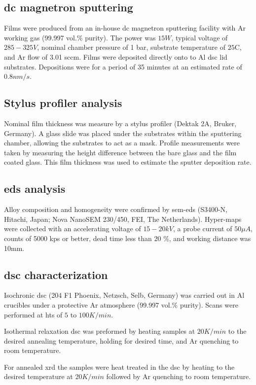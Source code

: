 \documentclass[a4paper,12pt,oneside]{article}%
\begin{document}
\subsection{\acrshort{dc} magnetron sputtering}
Films were produced from an in-house \gls{dc} magnetron sputtering facility with Ar working gas (99.997 vol.\% purity). The power was $15W$, typical voltage of $285-325V$, nominal chamber pressure of 1 bar, substrate temperature of $25$\degree C, and Ar flow of 3.01 \acrshort{sccm}. Films were deposited directly onto to Al \acrshort{dsc} lid substrates. Depositions were for a period of 35 minutes at an estimated rate of $0.8 nm/s$. 

\subsection{Stylus profiler analysis}
Nominal film thickness was measure by a stylus profiler (Dektak 2A, Bruker, Germany). A glass slide was placed under the substrates within the sputtering chamber, allowing the substrates to act as a mask. Profile measurements were taken by measuring the height difference between the bare glass and the film coated glass. This film thickness was used to estimate the sputter deposition rate.  

\subsection{\acrshort{eds} analysis}
Alloy composition and homogeneity were confirmed by \acrshort{sem}-\acrshort{eds} (S3400-N, Hitachi, Japan; Nova NanoSEM 230/450, FEI, The Netherlands). Hyper-maps were collected with an accelerating voltage of $15-20kV$, a probe current of $50 \mu A$, counts of 5000 kps or better, dead time less than 20 \%, and working distance was 10mm.

\subsection{\acrshort{dsc} characterization}
Isochronic \acrshort{dsc} (204 F1 Phoenix, Netzsch, Selb, Germany) was carried out in Al crucibles under a protective Ar atmosphere (99.997 vol.\% purity). Scans were performed at \glspl{ht} of $5$ to $100 K/min$. 

Isothermal relaxation \acrshort{dsc} was preformed by heating samples at $20 K/min$ to the desired annealing temperature, holding for desired time, and Ar quenching to room temperature.

For annealed \acrshort{xrd} the samples were heat treated in the \acrshort{dsc} by heating to the desired temperature at $20 K/min$ followed by Ar quenching to room temperature.
\end{document}
